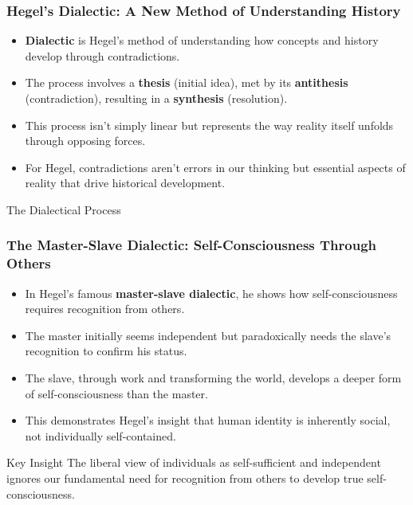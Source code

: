 \documentclass{beamer}
\begin{document}
\begin{frame}
\frametitle{Hegel's Dialectic: A New Method of Understanding History}
\begin{itemize}
    \item \textbf{Dialectic} is Hegel's method of understanding how concepts and history develop through contradictions.
    \item The process involves a \textbf{thesis} (initial idea), met by its \textbf{antithesis} (contradiction), resulting in a \textbf{synthesis} (resolution).
    \item This process isn't simply linear but represents the way reality itself unfolds through opposing forces.
    \item For Hegel, contradictions aren't errors in our thinking but essential aspects of reality that drive historical development.
\end{itemize}

\begin{block}{The Dialectical Process}
\begin{center}
\end{center}
\end{block}
\end{frame}

\begin{frame}
\frametitle{The Master-Slave Dialectic: Self-Consciousness Through Others}
\begin{itemize}
    \item In Hegel's famous \textbf{master-slave dialectic}, he shows how self-consciousness requires recognition from others.
    \item The master initially seems independent but paradoxically needs the slave's recognition to confirm his status.
    \item The slave, through work and transforming the world, develops a deeper form of self-consciousness than the master.
    \item This demonstrates Hegel's insight that human identity is inherently social, not individually self-contained.
\end{itemize}

\begin{alertblock}{Key Insight}
The liberal view of individuals as self-sufficient and independent ignores our fundamental need for recognition from others to develop true self-consciousness.
\end{alertblock}
\end{frame}
\end{document}
